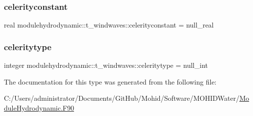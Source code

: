 \subsubsection{\texorpdfstring{celerityconstant}{celerityconstant}}
{\footnotesize\ttfamily real modulehydrodynamic\+::t\+\_\+windwaves\+::celerityconstant = null\+\_\+real\hspace{0.3cm}{\ttfamily [private]}}

\mbox{\label{structmodulehydrodynamic_1_1t__windwaves_a2f0aa5a1fe06bbcf21cc78a316405b70}} 
\subsubsection{\texorpdfstring{celeritytype}{celeritytype}}
{\footnotesize\ttfamily integer modulehydrodynamic\+::t\+\_\+windwaves\+::celeritytype = null\+\_\+int\hspace{0.3cm}{\ttfamily [private]}}



The documentation for this type was generated from the following file\+:\begin{DoxyCompactItemize}
\item 
C\+:/\+Users/administrator/\+Documents/\+Git\+Hub/\+Mohid/\+Software/\+M\+O\+H\+I\+D\+Water/\mbox{\hyperlink{_module_hydrodynamic_8_f90}{Module\+Hydrodynamic.\+F90}}\end{DoxyCompactItemize}
